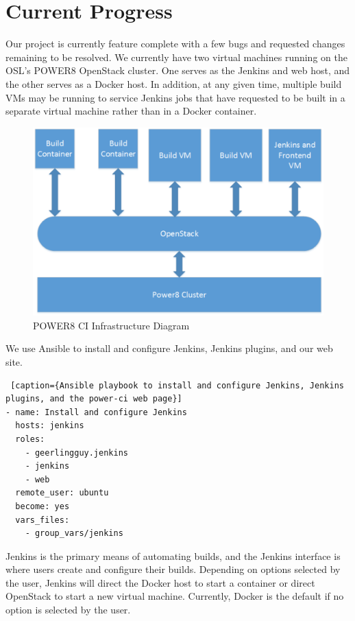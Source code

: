 \documentclass[10pt,onecolumn,journal,draftclsnofoot]{IEEEtran}
\begin{document}
\section{Current Progress}
Our project is currently feature complete with a few bugs and requested changes remaining to be resolved.
We currently have two virtual machines running on the OSL's POWER8 OpenStack cluster.
One serves as the Jenkins and web host, and the other serves as a Docker host. 
In addition, at any given time, multiple build VMs may be running to service Jenkins jobs that have requested to be built in a separate virtual machine rather than in a Docker container.\\
\begin{figure}[H] 
  \includegraphics[width=\textwidth]{images/infrastructure_diagram.eps}
  \caption{POWER8 CI Infrastructure Diagram}
\end{figure}

We use Ansible to install and configure Jenkins, Jenkins plugins, and our web site. 
\begin{lstlisting} [caption={Ansible playbook to install and configure Jenkins, Jenkins plugins, and the power-ci web page}]
- name: Install and configure Jenkins
  hosts: jenkins
  roles:
    - geerlingguy.jenkins
    - jenkins
    - web
  remote_user: ubuntu
  become: yes
  vars_files:
    - group_vars/jenkins
\end{lstlisting} 
Jenkins is the primary means of automating builds, and the Jenkins interface is where users create and configure their builds.
Depending on options selected by the user, Jenkins will direct the Docker host to start a container or direct OpenStack to start
a new virtual machine. 
Currently, Docker is the default if no option is selected by the user.
\end{document}
